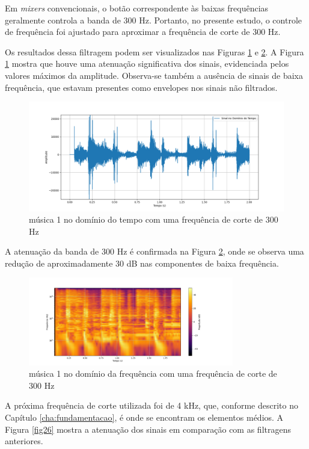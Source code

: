 Em \textit{mixers} convencionais, o botão correspondente às baixas frequências geralmente controla a banda de 300 Hz. Portanto, no presente estudo, o controle de frequência foi ajustado para aproximar a frequência de corte de 300 Hz.

Os resultados dessa filtragem podem ser visualizados nas Figuras \ref{fig28} e \ref{fig29}. A Figura \ref{fig28} mostra que houve uma atenuação significativa dos sinais, evidenciada pelos valores máximos da amplitude. Observa-se também a ausência de sinais de baixa frequência, que estavam presentes como envelopes nos sinais não filtrados.

\begin{figure}[h]
    \centering
    \includegraphics[width=\textwidth]{figuras/fig28.png}
    \caption{música 1 no domínio do tempo com uma frequência de corte de 300 Hz}
    \label{fig28}
\end{figure}

A atenuação da banda de 300 Hz é confirmada na Figura \ref{fig29}, onde se observa uma redução de aproximadamente 30 dB nas componentes de baixa frequência.

\begin{figure}[h]
    \centering
    \includegraphics[width=0.8\textwidth]{figuras/fig29.png}
    \caption{música 1 no domínio da frequência com uma frequência de corte de 300 Hz}
    \label{fig29}
\end{figure}

A próxima frequência de corte utilizada foi de 4 kHz, que, conforme descrito no Capítulo \ref{cha:fundamentacao}, é onde se encontram os elementos médios. A Figura \ref{fig26} mostra a atenuação dos sinais em comparação com as filtragens anteriores.

